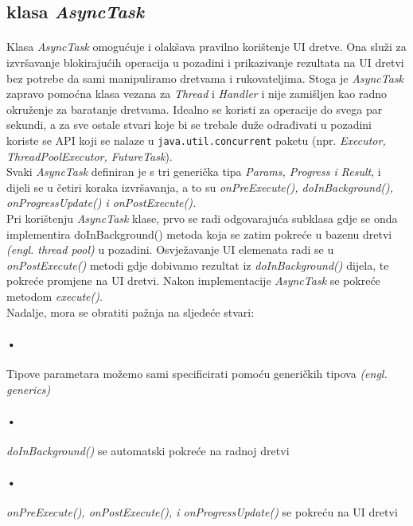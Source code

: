 \documentclass[times, utf8, zavrsni]{fer}
\begin{document}
\subsection{klasa \textit{AsyncTask}}
\paragraph{}
Klasa \textit{AsyncTask} omogućuje i olakšava pravilno korištenje UI dretve. Ona služi za izvršavanje blokirajućih operacija u pozadini i prikazivanje rezultata na UI dretvi bez potrebe da sami manipuliramo dretvama i rukovateljima. Stoga je \textit{AsyncTask} zapravo pomoćna klasa vezana za \textit{Thread} i \textit{Handler} i nije zamišljen kao radno okruženje za baratanje dretvama. Idealno se koristi za operacije do svega par sekundi, a za sve ostale stvari koje bi se trebale duže odrađivati u pozadini koriste se API koji se nalaze u \verb|java.util.concurrent| paketu (npr. \textit{Executor, ThreadPoolExecutor, FutureTask}).\\

Svaki \textit{AsyncTask} definiran je s tri generička tipa \textit{Params, Progress i Result}, i dijeli se u četiri koraka izvršavanja, a to su \textit{onPreExecute(), doInBackground(), onProgressUpdate() i onPostExecute().}\\

Pri korištenju \textit{AsyncTask} klase, prvo se radi odgovarajuća subklasa gdje se onda implementira doInBackground() metoda koja se zatim pokreće u bazenu dretvi \textit{(engl. thread pool)} u pozadini. Osvježavanje UI elemenata radi se u \textit{onPostExecute()} metodi gdje dobivamo rezultat iz \textit{doInBackground()} dijela, te pokreće promjene na UI dretvi. Nakon implementacije \textit{AsyncTask} se pokreće metodom \textit{execute()}.\\

Nadalje, mora se obratiti pažnja na sljedeće stvari:
\paragraph{•}
Tipove parametara možemo sami specificirati pomoću generičkih tipova \textit{(engl. generics)}
\paragraph{•}
\textit{doInBackground()} se automatski pokreće na radnoj dretvi
\paragraph{•}
\textit{onPreExecute(), onPostExecute(), i onProgressUpdate()} se pokreću na UI dretvi
\end{document}
